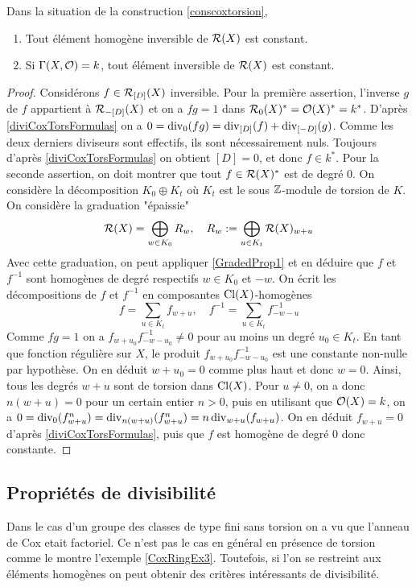 \begin{prop}
Dans la situation de la construction \ref{conscoxtorsion},
\begin{enumerate}
\item Tout élément homogène inversible de $\mathcal{R}(X)$ est constant.
\item Si $\Gamma(X, \mathcal{O})=k$, tout élément inversible de $\mathcal{R}(X)$ est constant.
\end{enumerate}
\end{prop}
\begin{proof}
Considérons $f\in\mathcal{R}_{[D]}(X)$ inversible. Pour la première assertion, l'inverse $g$ de $f$ appartient à $\mathcal{R}_{-[D]}(X)$ et on a $fg=1$ dans $\mathcal{R}_0(X)^*=\mathcal{O}(X)^*=k^*$. D'après \ref{diviCoxTorsFormulas} on a $0=\operatorname{div}_0(fg)=\operatorname{div}_{[D]}(f)+\operatorname{div}_{[-D]}(g)$. Comme les deux derniers diviseurs sont effectifs, ils sont nécessairement nuls. Toujours d'après \ref{diviCoxTorsFormulas} on obtient $[D]=0$, et donc $f\in k^*$.
Pour la seconde assertion, on doit montrer que tout $f\in\mathcal{R}(X)^*$ est de degré $0$. On considère la décomposition $K_0\oplus K_t$ où $K_t$ est le sous $\mathbb{Z}$-module de torsion de $K$.
On considère la graduation "épaissie"
$$\mathcal{R}(X)=\bigoplus_{w\in K_0}R_w,\,\,\,\,\,\, R_w:=\bigoplus_{u\in K_t}\mathcal{R}(X)_{w+u}$$
Avec cette graduation, on peut appliquer \ref{GradedProp1} et en déduire que $f$ et $f^{-1}$ sont homogènes de degré respectifs $w\in K_0$ et $-w$. On écrit les décompositions de $f$ et $f^{-1}$ en composantes $\operatorname{Cl}(X)$-homogènes
$$f=\sum_{u\in K_t}f_{w+u},\,\,\,\,\,\, f^{-1}=\sum_{u\in K_t}f^{-1}_{-w-u}$$
Comme $fg=1$ on a $f_{w+u_0}f^{-1}_{-w-u_0}\neq 0$ pour au moins un degré $u_0\in K_t$. En tant que fonction régulière sur $X$, le produit $f_{w+u_0}f^{-1}_{-w-u_0}$ est une constante non-nulle par hypothèse. On en déduit $w+u_0=0$ comme plus haut et donc $w=0$. Ainsi, tous les degrés $w+u$ sont de torsion dans $\operatorname{Cl}(X)$. Pour $u\neq 0$, on a donc $n(w+u)=0$ pour un certain entier $n>0$, puis en utilisant que $\mathcal{O}(X)=k$, on a $0=\operatorname{div}_{0}(f_{w+u}^n)=\operatorname{div}_{n(w+u)}(f_{w+u}^n)=n\operatorname{div}_{w+u}(f_{w+u})$. On en déduit $f_{w+u}=0$ d'après \ref{diviCoxTorsFormulas}, puis que $f$ est homogène de degré $0$ donc constante.
\end{proof}

\subsection{Propriétés de divisibilité}

Dans le cas d'un groupe des classes de type fini sans torsion on a vu que l'anneau de Cox etait factoriel. Ce n'est pas le cas en général en présence de torsion comme le montre l'exemple \ref{CoxRingEx3}. Toutefois, si l'on se restreint aux éléments homogènes on peut obtenir des critères intéressants de divisibilité. 

